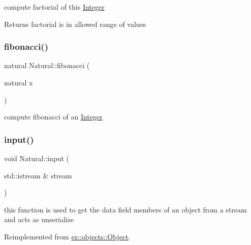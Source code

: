 compute factorial of this \hyperlink{classez_1_1objects_1_1Integer}{Integer} \begin{DoxyReturn}{Returns}
factorial is in allowed range of values 
\end{DoxyReturn}
\mbox{\label{classez_1_1objects_1_1Natural_a2039dd9d59e3ab225d38144cb9226f10}} 
\subsubsection{\texorpdfstring{fibonacci()}{fibonacci()}}
{\footnotesize\ttfamily natural Natural\+::fibonacci (\begin{DoxyParamCaption}\item[{natural}]{x }\end{DoxyParamCaption})\hspace{0.3cm}{\ttfamily [static]}}

compute fibonacci of an \hyperlink{classez_1_1objects_1_1Integer}{Integer} \mbox{\label{classez_1_1objects_1_1Natural_ae914aff21b276fbb1e73f48d426cbbc7}} 
\subsubsection{\texorpdfstring{input()}{input()}}
{\footnotesize\ttfamily void Natural\+::input (\begin{DoxyParamCaption}\item[{std\+::istream \&}]{stream }\end{DoxyParamCaption})\hspace{0.3cm}{\ttfamily [virtual]}}

this function is used to get the data field members of an object from a stream and acts as unserialize 

Reimplemented from \hyperlink{classez_1_1objects_1_1Object_a878bdc53b7f16fda6fa15dab214c4b6a}{ez\+::objects\+::\+Object}.

\mbox{\label{classez_1_1objects_1_1Natural_a0cb91a0c6b56b101bdf60e08df4d83f2}} 
